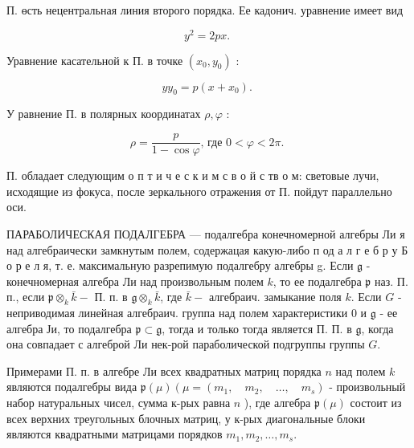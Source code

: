 \documentclass[10pt]{article}
\begin{document}
П. өсть нецентральная линия второго порядка. Ее кадонич. уравнение имеет вид



\[

y^{2}=2 p x \text {. }

\]



Уравнение касательной к П. в точке $\left(x_{0}, y_{0}\right)$ :



\[

y y_{0}=p\left(x+x_{0}\right) \text {. }

\]



У равнение П. в полярных координатах $\rho, \varphi$ :



\[

\rho=\frac{p}{1-\cos \varphi} \text {, где } 0<\varphi<2 \pi \text {. }

\]



П. обладает следующим о п т и ч е с к и м с в о й с тв о м: световые лучи, исходящие из фокуса, после зеркального отражения от П. пойдут параллельно оси.



ПАРАБОЛИЧЕСКАЯ ПОДАЛГЕБРА — подалгебра конечномерной алгебры Ли я над алгебраически замкнутым полем, содержацая какую-либо п од а л г е б р у Б о р е л я, т. е. максимальную разрепимую подалгебру алгебры g. Если $\mathfrak{g}$ - конечномерная алгебра Ли над произвольным полем $k$, то ее подалгебра $\mathfrak{p}$ наз. П. п., если $\mathfrak{p} \otimes_{k} \bar{k}-$ П. п. в $\mathfrak{g} \otimes_{k} \bar{k}$, где $\bar{k}-$ алгебраич. замыкание поля $k$. Если $G$ - неприводимая линейная алгебраич. группа над полем характеристики 0 и $\mathfrak{g}$ - ее алгебра Ји, то подалгебра $\mathfrak{p} \subset \mathfrak{g}$, тогда и только тогда является П. П. в $\mathfrak{g}$, когда она совпадает с алгеброй Ли нек-рой параболической подгруппы группы $G$.



Примерами П. п. в алгебре Ли всех квадратных матриц порядка $n$ над полем $k$ являются подалгебры вида $\mathfrak{p}(\mu)\left(\mu=\left(m_{1}, \quad m_{2}, \quad \ldots, \quad m_{s}\right)\right.$ - произвольный набор натуральных чисел, сумма к-рых равна $n$ ), где алгебра $\mathfrak{p}(\mu)$ состоит из всех верхних треугольных блочных матриц, у к-рых диагональные блоки являются квадратными матрицами порядков $m_{1}, m_{2}, \ldots, m_{s}$.
\end{document}
